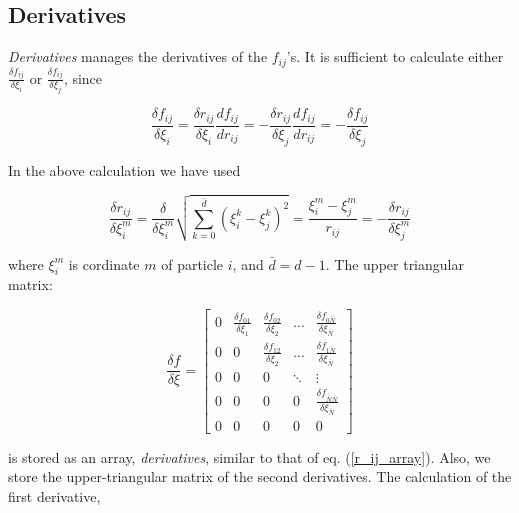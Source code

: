 \subsection{Derivatives}

\emph{Derivatives} manages the derivatives of the $f_{ij}$'s. 
\newline
It is sufficient to calculate either $\frac{\delta f_{ij}}{\delta
  \xi_i}$ or $\frac{\delta f_{ij}}{\delta \xi_j}$, since 

\begin{equation}
  \frac{\delta f_{ij}}{\delta \xi_i} = \frac{\delta r_{ij}}{\delta \xi_i}
  \frac{d f_{ij}} {d r_{ij}} = - \frac{\delta r_{ij}}{\delta \xi_j}
  \frac{d f_{ij}} {d r_{ij}} = - \frac{\delta f_{ij}}{\delta \xi_j}
\end{equation}

In the above calculation we have used

\begin{equation}
  \frac{\delta r_{ij}}{\delta \xi_i^m} = \frac{\delta}{\delta \xi_i^m} 
  \sqrt{ \sum_{k=0}^{\bar{d}} (\xi_i^k-\xi_j^k)^2} =
  \frac{\xi_i^m-\xi_j^m}{r_{ij}} = - \frac{\delta
  r_{ij}}{\delta \xi_j^m} 
\end{equation}

where $\xi_i^m$ is cordinate $m$ of particle $i$, and $\bar{d}=d-1$. \newline
The upper triangular matrix:

\begin{equation}
  \frac{\delta f}{\delta \xi} = \left[
  \begin{array}{ccccc}
    0 & \frac{\delta f_{01}}{\delta \xi_1} & \frac{\delta
    f_{02}}{\delta \xi_2} & \dots & \frac{\delta f_{0\bar{N}}}{\delta
    \xi_{\bar{N}}} \\ 
    0 &        0        & \frac{\delta f_{12}}{\delta \xi_2} & \dots & 
    \frac{\delta f_{1\bar{N}}}{\delta \xi_{\bar{N}}} \\
    0 &        0        &          0            &\ddots &  \vdots       \\
    0 &        0        &          0            &   0   &
    \frac{\delta f_{\bar{\bar{N}}\bar{N}}}{\delta \xi_{\bar{N}}} \\
    0 &        0        &          0            &   0   &   0  
  \end{array} \right]
\label{df_dxi}
\end{equation}

is stored as an array, \emph{derivatives}, similar to that of
eq. (\ref{r_ij_array}). Also, we store 
the upper-triangular matrix of the second derivatives. The calculation
of the first derivative,

